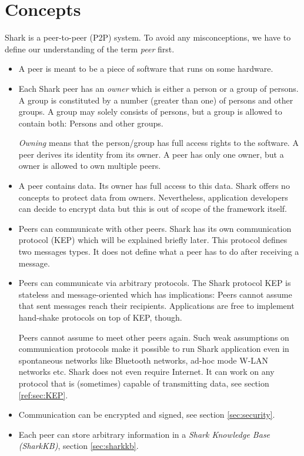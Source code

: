\chapter{Concepts}
Shark is a peer-to-peer (P2P) system. To avoid any misconceptions, we have to define our understanding of the term {\it peer} first.

\begin{itemize}
\item
A peer is meant to be a piece of software that runs on some hardware.

\item
Each Shark peer has an {\it owner} which is either a person or a group of persons. A group is constituted by a number (greater than one) of persons and other groups. A group may solely consists of persons, but a group is allowed to contain both: Persons and other groups.

{\it Owning} means that the person/group has full access rights to the software.
A peer derives its identity from its owner. A peer has only one owner, but a owner is allowed to own multiple peers.

\item
A peer contains data. Its owner has full access to this data. Shark offers no concepts to protect data from owners. Nevertheless, application developers can decide to encrypt data but this is out of scope of the framework itself.

\item
Peers can communicate with other peers. Shark has its own communication protocol (KEP) which will be explained briefly later. This protocol defines two messages types. It does not define what a peer has to do after receiving a message.

\item
Peers can communicate via arbitrary protocols. The Shark protocol KEP is stateless and message-oriented which has implications: Peers cannot assume that sent messages reach their recipients. Applications are free to implement hand-shake protocols on top of KEP, though.

Peers cannot assume to meet other peers again. Such weak assumptions on communication protocols make it possible to run Shark application even in spontaneous networks like Bluetooth networks, ad-hoc mode W-LAN networks etc. Shark does not even require Internet. It can work on any protocol that is (sometimes) capable of transmitting data, see section \ref{ref:sec:KEP}.

\item
Communication can be encrypted and signed, see section \ref{sec:security}.

\item
Each peer can store arbitrary information in a {\it Shark Knowledge Base (SharkKB)}, section \ref{sec:sharkkb}.


\end{itemize}

